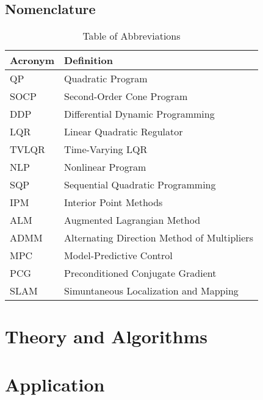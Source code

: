 \documentclass[10pt,oneside]{book}
\begin{document}
    \chapter*{Nomenclature}
    \begin{table}[h]
    \centering
    \begin{tabular}{l l}
            Acronym & Definition \\
            \midrule
            QP   & Quadratic Program \\
            SOCP & Second-Order Cone Program \\
            DDP  & Differential Dynamic Programming \\
            LQR  & Linear Quadratic Regulator \\
            TVLQR & Time-Varying LQR \\
            NLP  & Nonlinear Program \\
            SQP  & Sequential Quadratic Programming \\
            IPM  & Interior Point Methods \\
            ALM  & Augmented Lagrangian Method \\
            ADMM & Alternating Direction Method of Multipliers \\
            MPC  & Model-Predictive Control \\
            PCG  & Preconditioned Conjugate Gradient \\
            SLAM & Simuntaneous Localization and Mapping \\
    \end{tabular}
    \caption{Table of Abbreviations}
    \label{tab:abbreviations}
    \end{table}
    

    \mainmatter
    \pagestyle{fancy}
    

    

    \part{Theory and Algorithms} \label{part:theory}
    
    

    
    

    

    \part{Application} \label{part:application}
    
    

    \appendix
    

    \printbibliography
    
\end{document}

